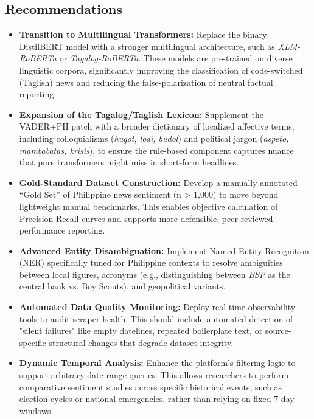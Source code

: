 \documentclass[sigconf, nonacm]{acmart}
\begin{document}
\subsection{Recommendations}
\begin{itemize}
    \item \textbf{Transition to Multilingual Transformers:} Replace the binary DistilBERT model with a stronger multilingual architecture, such as \textit{XLM-RoBERTa} or \textit{Tagalog-RoBERTa}. These models are pre-trained on diverse linguistic corpora, significantly improving the classification of code-switched (Taglish) news and reducing the false-polarization of neutral factual reporting.
    
    \item \textbf{Expansion of the Tagalog/Taglish Lexicon:} Supplement the VADER+PH patch with a broader dictionary of localized affective terms, including colloquialisms (\textit{hugot, lodi, budol}) and political jargon (\textit{aspeto, mambabatas, krisis}), to ensure the rule-based component captures nuance that pure transformers might miss in short-form headlines.
    
    \item \textbf{Gold-Standard Dataset Construction:} Develop a manually annotated ``Gold Set'' of Philippine news sentiment (n > 1,000) to move beyond lightweight manual benchmarks. This enables objective calculation of Precision-Recall curves and supports more defensible, peer-reviewed performance reporting.
    
    \item \textbf{Advanced Entity Disambiguation:} Implement Named Entity Recognition (NER) specifically tuned for Philippine contexts to resolve ambiguities between local figures, acronyms (e.g., distinguishing between \textit{BSP} as the central bank vs. Boy Scouts), and geopolitical variants.
    
    \item \textbf{Automated Data Quality Monitoring:} Deploy real-time observability tools to audit scraper health. This should include automated detection of "silent failures" like empty datelines, repeated boilerplate text, or source-specific structural changes that degrade dataset integrity.
    
    \item \textbf{Dynamic Temporal Analysis:} Enhance the platform's filtering logic to support arbitrary date-range queries. This allows researchers to perform comparative sentiment studies across specific historical events, such as election cycles or national emergencies, rather than relying on fixed 7-day windows.
\end{itemize}
\end{document}

